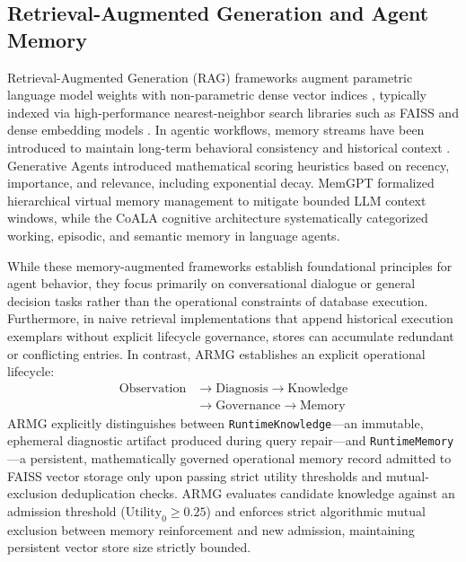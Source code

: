 \subsection{Retrieval-Augmented Generation and Agent Memory}
Retrieval-Augmented Generation (RAG) frameworks augment parametric language model weights with non-parametric dense vector indices \cite{lewis2020rag}, typically indexed via high-performance nearest-neighbor search libraries such as FAISS \cite{johnson2021faiss} and dense embedding models \cite{nussbaum2024nomic}. In agentic workflows, memory streams have been introduced to maintain long-term behavioral consistency and historical context \cite{park2023generativeagents, packer2023memgpt, sumers2024coala}. Generative Agents \cite{park2023generativeagents} introduced mathematical scoring heuristics based on recency, importance, and relevance, including exponential decay. MemGPT \cite{packer2023memgpt} formalized hierarchical virtual memory management to mitigate bounded LLM context windows, while the CoALA cognitive architecture \cite{sumers2024coala} systematically categorized working, episodic, and semantic memory in language agents.

While these memory-augmented frameworks establish foundational principles for agent behavior, they focus primarily on conversational dialogue or general decision tasks rather than the operational constraints of database execution. Furthermore, in naive retrieval implementations that append historical execution exemplars without explicit lifecycle governance, stores can accumulate redundant or conflicting entries. In contrast, ARMG establishes an explicit operational lifecycle:
\begin{equation}
\begin{aligned}
\text{Observation} &\to \text{Diagnosis} \to \text{Knowledge} \\
&\to \text{Governance} \to \text{Memory}
\end{aligned}
\end{equation}
ARMG explicitly distinguishes between \texttt{Runtime\-Knowledge}---an immutable, ephemeral diagnostic artifact produced during query repair---and \texttt{Runtime\-Memory}---a persistent, mathematically governed operational memory record admitted to FAISS vector storage only upon passing strict utility thresholds and mutual-exclusion deduplication checks. ARMG evaluates candidate knowledge against an admission threshold ($\text{Utility}_0 \ge 0.25$) and enforces strict algorithmic mutual exclusion between memory reinforcement and new admission, maintaining persistent vector store size strictly bounded.

